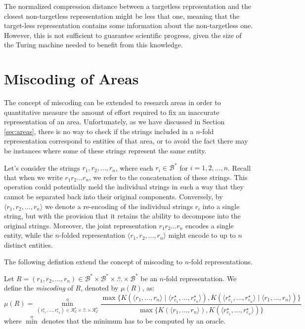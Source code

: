 The normalized compression distance between a targetless representation and the closest non-targetless representation might be less that one, meaning that the target-less representation contains some information about the non-targetless one. However, this is not sufficient to guarantee scientific progress, given the size of the Turing machine needed to benefit from this knowledge.

%
%
\section{Miscoding of Areas}
\label{sec:miscoding_areas}

The concept of miscoding can be extended to research areas in order to quantitative measure the amount of effort required to fix an inaccurate representation of an area. Unfortunately, as we have discussed in Section \ref{sec:areas}, there is no way to check if the strings included in a $n$-fold representation correspond to entities of that area, or to avoid the fact there may be instances where some of these strings represent the same entity.

Let's consider the strings $r_1, r_2, \ldots, r_n$, where each $r_i \in \mathcal{B}^\ast$ for $i=1, 2, \ldots, n$. Recall that when we write $r_1 r_2 \ldots r_n$, we refer to the concatenation of these strings. This operation could potentially meld the individual strings in such a way that they cannot be separated back into their original components. Conversely, by $\langle r_1, r_2, \ldots, r_n \rangle$ we denote a re-encoding of the individual strings $r_i$ into a single string, but with the provision that it retains the ability to decompose into the original strings. Moreover, the joint representation $r_1 r_2 \ldots r_n$ encodes a single entity, while the $n$-folded representation $\langle r_1, r_2, \ldots, r_n \rangle$ might encode to up to $n$ distinct entities.

The following defintion extend the concept of miscoding to $n$-fold representations.

\begin{definition}
Let $R = \left( r_1, r_2, \ldots, r_n \right) \in \mathcal{B}^\ast \times \mathcal{B}^\ast \times \overset{n} \ldots \times \mathcal{B}^\ast$  be an $n$-fold representation. We define the \emph{miscoding} of $R$, denoted by $\mu(R)$, as:
\[
\mu(R) = \overset{o}{ \underset{ (r^\star_{e_1}, \ldots, r^\star_{e_n}) \in \mathcal{R}^\star_\mathcal{E} \times \overset{n} \ldots \times \mathcal{R}^\star_\mathcal{E} } \min} \frac{ \max\{ K \left( \langle r_1, \ldots, r_n \rangle \mid \langle r^\star_{e_1}, \ldots, r^\star_{e_n} \rangle \right), K \left( \langle  r^\star_{e_1}, \ldots, r^\star_{e_n} \rangle \mid \langle r_1, \ldots, r_n \rangle \right) \} } { \max\{ K \left( \langle r_1, \ldots, r_n \rangle \right), K \left( \langle r^\star_{e_1}, \ldots, r^\star_{e_n} \rangle \right) \} }
\]
where $\overset{o}{\min}$ denotes that the minimum has to be computed by an oracle.
\end{definition}

